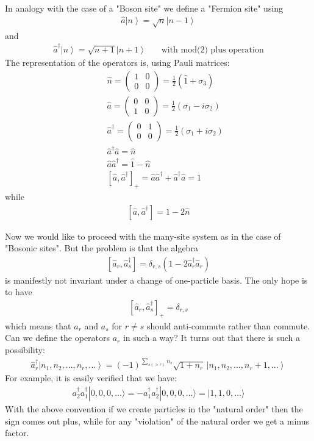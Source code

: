\documentclass[onecolumn,fleqn, 11pt]{revtex4}
\newcommand{\beq}{\begin{eqnarray}}
\newcommand{\eeq}{\end{eqnarray}}
\begin{document}
In analogy with the case of a "Boson site" we define a "Fermion site" using 
\beq
\hat{a}\left\vert n\right\rangle =\sqrt{n}\left\vert n-1\right\rangle 
\eeq
and
\beq
\hat{a}^{\dag}\left\vert n\right\rangle =\sqrt{n+1}\left\vert 
n+1\right\rangle 
\ \ \ \ \ \ \ \ \mbox{with mod(2) plus operation}
\eeq
The representation of the operators is, using Pauli matrices:
\beq
&& \hat{n}=  
\begin{pmatrix} 
1 & 0\\ 
0 & 0 
\end{pmatrix} 
=\frac{1}{2}\left(\hat{1}+\sigma_{3}\right) 
\\ \nonumber
&& \hat{a}= 
\begin{pmatrix} 
0 & 0\\ 
1 & 0 
\end{pmatrix} 
=\frac{1}{2}\left(  \sigma_{1}-i\sigma_{2}\right) 
\\ \nonumber
&& \hat{a}^{\dag}=  
\begin{pmatrix} 
0 & 1\\ 
0 & 0 
\end{pmatrix} 
=\frac{1}{2}\left(\sigma_{1}+i\sigma_{2}\right) 
\\ \nonumber
&& \hat{a}^{\dag}\hat{a} = \hat{n}
\\ \nonumber
&& \hat{a}\hat{a}^{\dag} = \hat{1} - \hat{n}
\\ \nonumber
&& \left[ \hat{a},\hat{a}^{\dag}\right]_{+}
=\hat{a}\hat{a}^{\dag}+\hat{a}^{\dag}\hat{a} = 1 
\eeq
while 
\beq
\left[\hat{a},\hat{a}^{\dag}\right] = 1-2\hat{n}
\eeq


Now we would like to proceed with the many-site system  
as in the case of "Bosonic sites". But the problem is that 
the algebra 
\beq
\left[\hat{a}_r,\hat{a}_s^{\dag}\right] 
= \delta_{r,s} (1-2\hat{a}_r^{\dag}\hat{a}_r)
\eeq
is manifestly not invariant under a change 
of one-particle basis. The only hope is to 
have 
\beq
\left[\hat{a}_r,\hat{a}_s^{\dag}\right]_{+} = \delta_{r,s} 
\eeq
which means that $a_r$ and $a_s$ for $r\ne s$ 
should anti-commute rather than commute. 
Can we define the operators $a_r$ in such 
a way? It turns out that there is such a possibility:
\beq
\hat{a}_{r}^{\dag}
\left\vert n_{1},n_{2}, \dots ,n_{r}, \dots \right\rangle 
= (-1)^{ \sum_{s(>r)} n_s }\sqrt{1+n_r}\,  
\left\vert n_{1},n_{2}, \dots ,n_{r}+1, \dots \right\rangle
\eeq
For example, it is easily verified that we have:
\beq
a_2^{\dag} a_1^{\dag} |0,0,0, \dots \rangle =
-a_1^{\dag} a_2^{\dag} |0,0,0, \dots \rangle =
|1,1,0, \dots \rangle 
\eeq
With the above convention if we create 
particles in the "natural order" then the 
sign comes out plus, while for any  
"violation" of the natural order we get 
a minus factor.
\end{document}
